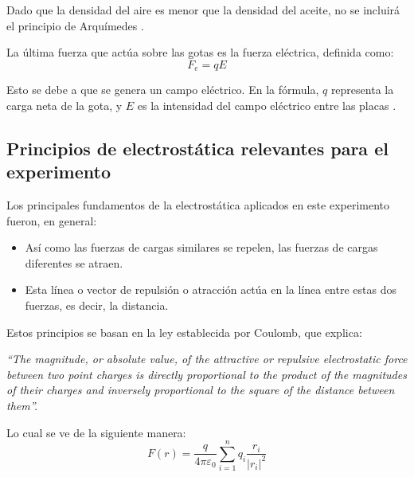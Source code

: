 \documentclass[
 reprint,
 amsmath,amssymb,
 aps,
]{revtex4-2}
\begin{document}
Dado que la densidad del aire es menor que la densidad del aceite, no se incluirá el principio de Arquímedes \cite{RSEF2011}.

La última fuerza que actúa sobre las gotas es la fuerza eléctrica, definida como:
\begin{equation}
F_e=qE
\label{eq:Fe}
\end{equation}

Esto se debe a que se genera un campo eléctrico. En la fórmula, \(q\) representa la carga neta de la gota, y \(E\) es la intensidad del campo eléctrico entre las placas \cite{Luna_sf}\cite{UofToronto_sf}.

\subsection{\label{sec:citeref}Principios de electrostática relevantes para el experimento}
Los principales fundamentos de la electrostática aplicados en este experimento fueron, en general:
\begin{itemize}
  \item Así como las fuerzas de cargas similares se repelen, las fuerzas de cargas diferentes se atraen.
  \item Esta línea o vector de repulsión o atracción actúa en la línea entre estas dos fuerzas, es decir, la distancia.
\end{itemize}
Estos principios se basan en la ley establecida por Coulomb, que explica:
\begin{center}
\textit{``The magnitude, or absolute value, of the attractive or repulsive electrostatic force between two point charges is directly proportional to the product of the magnitudes of their charges and inversely proportional to the square of the distance between them''.}\cite{Coulomb1785}
\end{center}
Lo cual se ve de la siguiente manera:
\begin{equation}
F(r)=\frac{q}{4\pi\varepsilon_0}\sum_{i=1}^nq_i\frac{\hat{r}_i}{|r_i|^2}
\label{Coulomb}
\end{equation}
\end{document}
